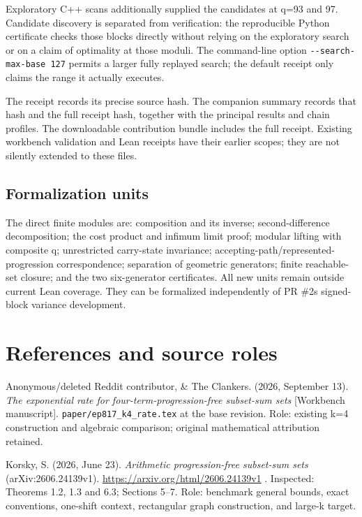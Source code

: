 Exploratory C++ scans additionally supplied the candidates at q=93 and 97. Candidate discovery is separated from verification: the reproducible Python certificate checks those blocks directly without relying on the exploratory search or on a claim of optimality at those moduli. The command-line option \texttt{-\/-search-max-base\ 127} permits a larger fully replayed search; the default receipt only claims the range it actually executes.

The receipt records its precise source hash. The companion summary records that hash and the full receipt hash, together with the principal results and chain profiles. The downloadable contribution bundle includes the full receipt. Existing workbench validation and Lean receipts have their earlier scopes; they are not silently extended to these files.

\subsection{Formalization units}\label{n02-formalization-units}

The direct finite modules are: composition and its inverse; second-difference decomposition; the cost product and infimum limit proof; modular lifting with composite q; unrestricted carry-state invariance; accepting-path/represented-progression correspondence; separation of geometric generators; finite reachable-set closure; and the two six-generator certificates. All new units remain outside current Lean coverage. They can be formalized independently of PR \#2\textquotesingle s signed-block variance development.

\section{References and source roles}\label{n02-references-and-source-roles}

Anonymous/deleted Reddit contributor, \& The Clankers. (2026, September 13). \emph{The exponential rate for four-term-progression-free subset-sum sets} {[}Workbench manuscript{]}. \texttt{paper/ep817\_k4\_rate.tex} at the base revision. Role: existing k=4 construction and algebraic comparison; original mathematical attribution retained.

Korsky, S. (2026, June 23). \emph{Arithmetic progression-free subset-sum sets} (arXiv:2606.24139v1). \url{https://arxiv.org/html/2606.24139v1} . Inspected: Theorems 1.2, 1.3 and 6.3; Sections 5--7. Role: benchmark general bounds, exact conventions, one-shift context, rectangular graph construction, and large-k target.

